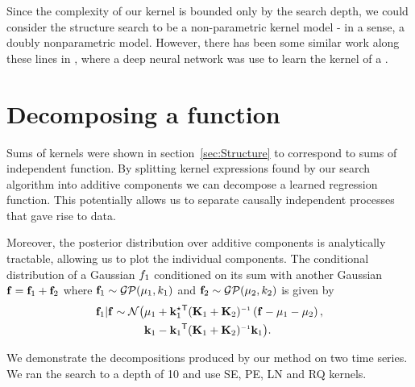 \documentclass[twoside]{article}
\begin{document}
Since the complexity of our kernel is bounded only by the search depth, we could consider the structure search to be a non-parametric kernel model - in a sense, a doubly nonparametric model.  However, there has been some similar work along these lines in \cite{salakhutdinov2008using}, where a deep neural network was use to learn the kernel of a \gp{}.


\section{Decomposing a function}

Sums of kernels were shown in section~\ref{sec:Structure} to correspond to sums of independent function.
By splitting kernel expressions found by our search algorithm into additive components we can decompose a learned regression function.
This potentially allows us to separate causally independent processes that gave rise to data.

Moreover, the posterior distribution over additive components is analytically tractable, allowing us to plot the individual components.
The conditional distribution of a Gaussian $f_1$ conditioned on its sum with another Gaussian ${\bf{f}} = {\bf{f}}_1 + {\bf{f}}_2$ where ${\bf{f}}_1 \sim \mathcal{GP}( {\bf{\mu}}_1, k_1)$ and ${\bf{f}}_2 \sim \mathcal{GP}( {\bf{\mu}}_2, k_2)$ is given by
\begin{align}
\vf_1 | \vf \sim \mathcal{N} \big( & \vmu_1 + \vk_1^\star\tra (\vK_1 + \vK_2)\inv \left( \vf - \vmu_1 - \vmu_2 \right), \nonumber \\
& \vk_1 - \vk_1\tra (\vK_1 + \vK_2)\inv \vk_1 \big).
\end{align}


We demonstrate the decompositions produced by our method on two time series.
We ran the search to a depth of 10 and use SE, PE, LN and RQ kernels.

% 

\end{document}
